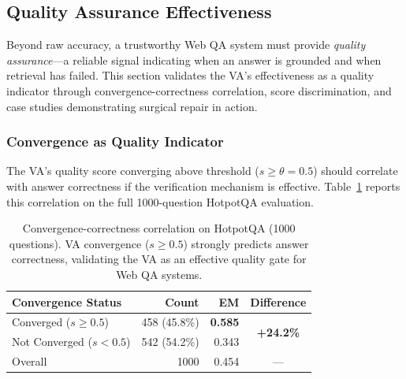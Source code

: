 
\subsection{Quality Assurance Effectiveness}
\label{sec:quality_analysis}

Beyond raw accuracy, a trustworthy Web QA system must provide \emph{quality
assurance}---a reliable signal indicating when an answer is grounded and when
retrieval has failed. This section validates the VA's effectiveness as a quality
indicator through convergence-correctness correlation, score discrimination, and
case studies demonstrating surgical repair in action.

\subsubsection{Convergence as Quality Indicator}

The VA's quality score converging above threshold ($s \geq \theta = 0.5$) should
correlate with answer correctness if the verification mechanism is effective.
Table~\ref{tab:convergence_quality} reports this correlation on the full
1000-question HotpotQA evaluation.

\begin{table}[t]
\centering
\caption{Convergence-correctness correlation on HotpotQA (1000 questions).
VA convergence ($s \geq 0.5$) strongly predicts answer correctness, validating
the VA as an effective quality gate for Web QA systems.}
\label{tab:convergence_quality}
\small
\begin{tabular}{lrrc}
\toprule
Convergence Status & Count & EM & Difference \\
\midrule
Converged ($s \geq 0.5$)     & 458 (45.8\%) & \textbf{0.585} & \multirow{2}{*}{\textbf{+24.2\%}} \\
Not Converged ($s < 0.5$)    & 542 (54.2\%) & 0.343          & \\
\midrule
Overall                       & 1000         & 0.454          & --- \\
\bottomrule
\end{tabular}
\end{table}

